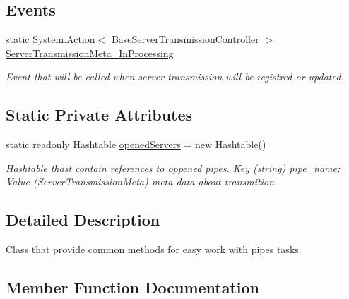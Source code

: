\subsection*{Events}
\begin{DoxyCompactItemize}
\item 
static System.\+Action$<$ \mbox{\hyperlink{class_pipes_provider_1_1_server_1_1_transmission_controllers_1_1_base_server_transmission_controller}{Base\+Server\+Transmission\+Controller}} $>$ \mbox{\hyperlink{class_pipes_provider_1_1_server_1_1_server_a_p_i_adf4c77f25cd481b8190240e4aca06e56}{Server\+Transmission\+Meta\+\_\+\+In\+Processing}}
\begin{DoxyCompactList}\small\item\em Event that will be called when server transmission will be registred or updated. \end{DoxyCompactList}\end{DoxyCompactItemize}
\subsection*{Static Private Attributes}
\begin{DoxyCompactItemize}
\item 
static readonly Hashtable \mbox{\hyperlink{class_pipes_provider_1_1_server_1_1_server_a_p_i_ac18f0fca4de6269edeb97379112e67ca}{opened\+Servers}} = new Hashtable()
\begin{DoxyCompactList}\small\item\em Hashtable thast contain references to oppened pipes. Key (string) pipe\+\_\+name; Value (Server\+Transmission\+Meta) meta data about transmition. \end{DoxyCompactList}\end{DoxyCompactItemize}


\subsection{Detailed Description}
Class that provide common methods for easy work with pipes\textquotesingle{} tasks. 



\subsection{Member Function Documentation}
\mbox{\label{class_pipes_provider_1_1_server_1_1_server_a_p_i_aaf9afb864cf452d3842f0a6546569a32}} 
